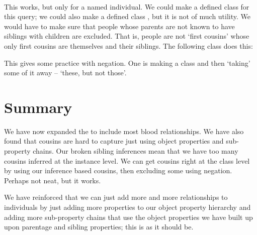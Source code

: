 \\
This works, but only for a named individual. We could make a defined class for this query; we could also make a defined class , but it is not of much utility. We would have to make sure that people whose parents are not known to have siblings with children are excluded. That is, people are not `first cousins' whose only first cousins are themselves and their siblings. The following class does this:


This gives some practice with negation. One is making a class and then `taking' some of it away -- `these, but not those'.\herebedragons 

\section{Summary}

We have now expanded the \fhkb to include most blood relationships. We have also found that cousins are hard to capture just using object properties and sub-property chains. Our broken sibling inferences mean that we have too many cousins inferred at the instance level. We can get cousins right at the class level by using our inference based cousins, then excluding some using negation. Perhaps not neat, but it works.

We have reinforced that we can just add more and more relationships to individuals by just adding more properties to our \fhkb object property hierarchy and adding more sub-property chains that use the object properties we have built up upon parentage and sibling properties; this is as it should be.
\\


